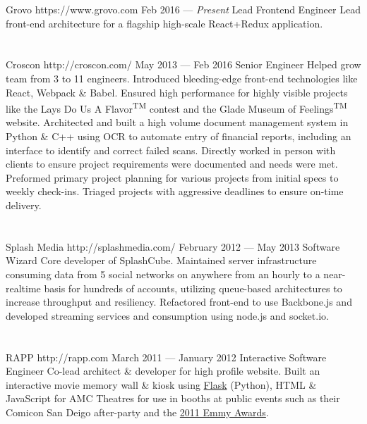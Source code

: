 \documentclass{resume}
\begin{document}
\employer
	{Grovo}
	{https://www.grovo.com}
	{Feb 2016 --- \emph{Present}}
	{Lead Frontend Engineer}
	{Lead front-end architecture for a flagship high-scale React+Redux application.}
\\ \\ \\
\employer
	{Croscon}
	{http://croscon.com/}
	{May 2013 --- Feb 2016}
	{Senior Engineer}
	{Helped grow team from 3 to 11 engineers. Introduced bleeding-edge front-end technologies like React, Webpack \& Babel. Ensured high performance for highly visible projects like the Lays\textsuperscript{\textregistered} Do Us A Flavor\textsuperscript{TM} contest and the Glade\textsuperscript{\textregistered} Museum of Feelings\textsuperscript{TM} website. Architected and built a high volume document management system in Python \& C++ using OCR to automate entry of financial reports, including an interface to identify and correct failed scans. Directly worked in person with clients to ensure project requirements were documented and needs were met. Preformed primary project planning for various projects from initial specs to weekly check-ins. Triaged projects with aggressive deadlines to ensure on-time delivery.}
\\ \\ \\
\employer
	{Splash Media}
	{http://splashmedia.com/}
	{February 2012 --- May 2013}
	{Software Wizard}
	{Core developer of SplashCube. Maintained server infrastructure consuming data from 5 social networks on anywhere from an hourly to a near-realtime basis for hundreds of accounts, utilizing queue-based architectures to increase throughput and resiliency. Refactored front-end to use Backbone.js and developed streaming services and consumption using node.js and socket.io.}
\\ \\ \\
\employer
	{RAPP}
	{http://rapp.com}
	{March 2011 --- January 2012}
	{Interactive Software Engineer}
	{Co-lead architect \& developer for high profile website. Built an interactive movie memory wall \& kiosk using \href{http://flask.pocoo.org/}{Flask} (Python), HTML \& JavaScript for AMC Theatres for use in booths at public events such as their Comicon San Deigo after-party and the \href{http://www.accesshollywood.com/backstage-at-the-emmys/emmys-2011-backstage-at-the-hp-touchsmart-gift-lounge-day-1_gallerytab_3129/20}{2011 Emmy Awards}.}
\\ \\ \\
\end{document}
